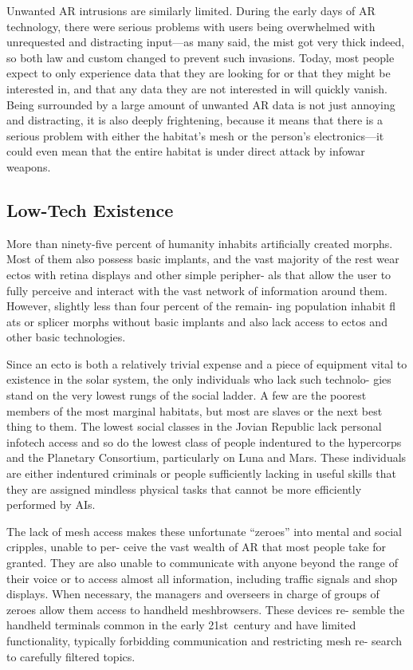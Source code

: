 Unwanted AR intrusions are similarly limited. 
During the early days of AR technology, there were 
serious problems with users being overwhelmed with 
unrequested and distracting input—as many said, the 
mist got very thick indeed, so both law and custom 
changed to prevent such invasions. Today, most people 
expect to only experience data that they are looking for 
or that they might be interested in, and that any data 
they are not interested in will quickly vanish. Being 
surrounded by a large amount of unwanted AR data 
is not just annoying and distracting, it is also deeply 
frightening, because it means that there is a serious 
problem with either the habitat's mesh or the person's 
electronics—it could even mean that the entire habitat 
is under direct attack by infowar weapons.

\subsection{Low-Tech Existence}

More than ninety-five percent of humanity inhabits 
artificially created morphs. Most of them also possess 
basic implants, and the vast majority of the rest wear 
ectos with retina displays and other simple peripher-
als that allow the user to fully perceive and interact 
with the vast network of information around them. 
However, slightly less than four percent of the remain-
ing population inhabit fl ats or splicer morphs without 
basic implants and also lack access to ectos and other 
basic technologies.

Since an ecto is both a relatively trivial expense and 
a piece of equipment vital to existence in the solar 
system, the only individuals who lack such technolo-
gies stand on the very lowest rungs of the social ladder. 
A few are the poorest members of the most marginal 
habitats, but most are slaves or the next best thing to 
them. The lowest social classes in the Jovian Republic 
lack personal infotech access and so do the lowest 
class of people indentured to the hypercorps and the 
Planetary Consortium, particularly on Luna and Mars. 
These individuals are either indentured criminals or 
people sufficiently lacking in useful skills that they are 
assigned mindless physical tasks that cannot be more 
efficiently performed by AIs.

The lack of mesh access makes these unfortunate 
``zeroes'' into mental and social cripples, unable to per-
ceive the vast wealth of AR that most people take for 
granted. They are also unable to communicate with 
anyone beyond the range of their voice or to access 
almost all information, including traffic signals and 
shop displays. When necessary, the managers and 
overseers in charge of groups of zeroes allow them 
access to handheld meshbrowsers. These devices re-
semble the handheld terminals common in the early 
21st century and have limited functionality, typically 
forbidding communication and restricting mesh re-
search to carefully filtered topics. 

